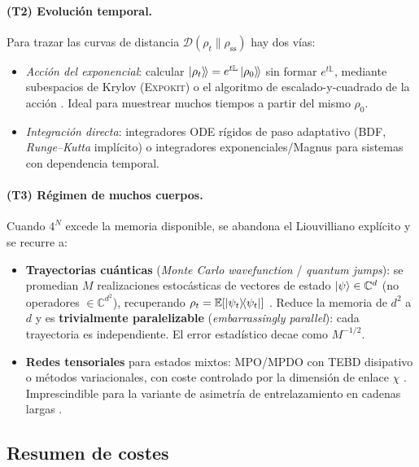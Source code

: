 \documentclass[11pt,a4paper]{article}
\theoremstyle{definition}
\theoremstyle{plain}
\newcommand{\Dop}{\mathcal{D}}
\newcommand{\rss}{\rho_{\mathrm{ss}}}
\begin{document}
\paragraph{(T2) Evolución temporal.}
Para trazar las curvas de distancia $\Dop(\rho_t\|\rss)$ hay dos vías:
\begin{itemize}[leftmargin=1.6em,itemsep=2pt]
\item \emph{Acción del exponencial}: calcular $\ket{\rho_t}\!\rangle=e^{t\mathbb{L}}\ket{\rho_0}\!\rangle$
sin formar $e^{t\mathbb{L}}$, mediante subespacios de Krylov (\textsc{Expokit}) o el algoritmo de
escalado-y-cuadrado de la acción \cite{Sidje1998,AlMohyHigham2011}. Ideal para muestrear muchos
tiempos a partir del mismo $\rho_0$.
\item \emph{Integración directa}: integradores ODE rígidos de paso adaptativo (BDF, \emph{Runge--Kutta}
implícito) o integradores exponenciales/Magnus para sistemas con dependencia temporal.
\end{itemize}

\paragraph{(T3) Régimen de muchos cuerpos.}
Cuando $4^N$ excede la memoria disponible, se abandona el Liouvilliano explícito y se recurre a:
\begin{itemize}[leftmargin=1.6em,itemsep=2pt]
\item \textbf{Trayectorias cuánticas} (\emph{Monte Carlo wavefunction} / \emph{quantum jumps}): se promedian
$M$ realizaciones estocásticas de vectores de estado $\ket{\psi}\in\mathbb{C}^{d}$ (no operadores
$\in\mathbb{C}^{d^2}$), recuperando $\rho_t=\mathbb{E}[\dyad{\psi_t}{\psi_t}]$ \cite{Daley2014}. Reduce la
memoria de $d^2$ a $d$ y es \textbf{trivialmente paralelizable} (\emph{embarrassingly parallel}): cada
trayectoria es independiente. El error estadístico decae como $M^{-1/2}$.
\item \textbf{Redes tensoriales} para estados mixtos: MPO/MPDO con TEBD disipativo o métodos variacionales,
con coste controlado por la dimensión de enlace $\chi$ \cite{Orus2014,Weimer2021}. Imprescindible para
la variante de asimetría de entrelazamiento en cadenas largas \cite{AresCalabreseMurciano2025}.
\end{itemize}

\subsection{Resumen de costes}
\end{document}
